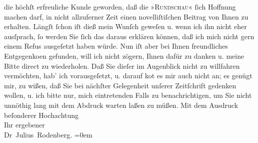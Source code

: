 \begin{ledgroupsized}[t]{13cm}
                    die höchſt erfreuliche Kunde geworden, daß die »\textsc{Rundschau}« ſich Hoffnung machen darf, in nicht allzuferner Zeit einen
                    novelliſtiſchen Beitrag von Ihnen zu erhalten. Längſt ſchon iſt dieß mein Wunſch
                    geweſen u. wenn ich ihn nicht eher ausſprach, ſo werden Sie ſich das daraus
                    erklären können, daß ich mich nicht gern einem Refus ausgeſetzt haben würde. Nun
                    iſt aber bei Ihnen freundliches Entgegenko{\geminationm}en
                    gefunden, will ich nicht zögern, Ihnen dafür zu danken u. meine Bitte direct zu
                    wiederholen. Daß Sie dieſer im Augenblick nicht zu willfahren vermöchten, hab’
                    ich vorausgeſetzt, u. darauf ko{\geminationm}t es mir auch nicht
                    an; es genügt mir, zu wißen, daß Sie bei nächſter Gelegenheit unſerer
                    Zeitſchrift gedenken wollen, u. {\pb}ich
                    bitte nur, mich eintretenden Falls zu benachrichtigen, um Sie nicht unnöthig
                    lang mit dem Abdruck warten laßen zu müßen.\pend
           \pstart
           Mit dem Ausdruck beſonderer Hochachtung{\\[\baselineskip]}Ihr ergebener{\\[\baselineskip]}\spacefill\mbox{Dr Julius Rodenberg.}\pend
           \leftskip=0em{}
         
         \endnumbering{}\end{ledgroupsized}  \newcommand{\dateiname}{L00749}\newcommand{\titel}{Julius Rodenberg an Arthur Schnitzler, 13. 12. 1897}\newcommand{\editorInnen}{Martin Anton Müller und Gerd-Hermann Susen}
      
